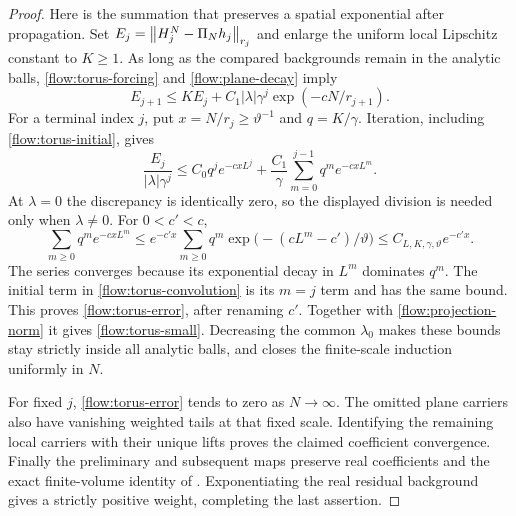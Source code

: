 \begin{proof}
Here is the summation that preserves a spatial exponential after
propagation.  Set $E_j=\left\|H_j^N-\Pi_Nh_j\right\|_{r_j}$ and enlarge the
uniform local Lipschitz constant to $K\ge1$.  As long as the compared
backgrounds remain in the analytic balls, \eqref{flow:torus-forcing}
and \eqref{flow:plane-decay} imply
\[
 E_{j+1}\le K E_j+C_1|\lambda|\gamma^j
                                      \exp(-cN/r_{j+1}).
\]
For a terminal index $j$, put $x=N/r_j\ge\vartheta^{-1}$ and
$q=K/\gamma$.  Iteration, including \eqref{flow:torus-initial}, gives
\begin{equation}\label{flow:torus-convolution}
 \frac{E_j}{|\lambda|\gamma^j}
  \le C_0q^j e^{-cxL^j}
       +\frac{C_1}{\gamma}\sum_{m=0}^{j-1}q^m e^{-cxL^m}.
\end{equation}
At $\lambda=0$ the discrepancy is identically zero, so the displayed
division is needed only when $\lambda\ne0$.  For $0<c'<c$,
\[
 \sum_{m\ge0}q^m e^{-cxL^m}
 \le e^{-c'x}
    \sum_{m\ge0}q^m
           \exp\bigl(-(cL^m-c')/\vartheta\bigr)
 \le C_{L,K,\gamma,\vartheta}e^{-c'x}.
\]
The series converges because its exponential decay in $L^m$
dominates $q^m$.  The initial term in
\eqref{flow:torus-convolution} is its $m=j$ term and has the same
bound.  This proves \eqref{flow:torus-error}, after renaming $c'$.
Together with \eqref{flow:projection-norm} it gives
\eqref{flow:torus-small}.  Decreasing the common $\lambda_0$ makes
these bounds stay strictly inside all analytic balls, and closes the
finite-scale induction uniformly in $N$.

For fixed $j$, \eqref{flow:torus-error} tends to zero as
$N\to\infty$.  The omitted plane carriers also have vanishing
weighted tails at that fixed scale.  Identifying the remaining local
carriers with their unique lifts proves the claimed coefficient
convergence.  Finally the preliminary and subsequent maps preserve
real coefficients and the exact finite-volume identity of
.  Exponentiating the real residual background gives
a strictly positive weight, completing the last assertion.
\end{proof}
